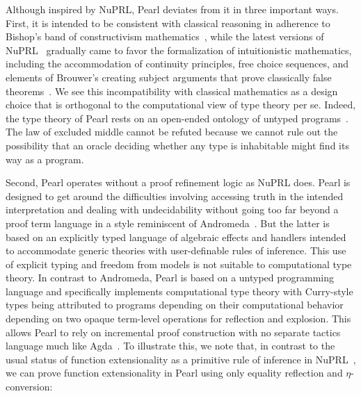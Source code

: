 \documentclass[a4paper]{article}
\begin{document}

Although inspired by NuPRL, Pearl deviates from it in three important ways. First, it is intended to be consistent with classical reasoning in adherence to Bishop's band of constructivism mathematics~\cite{bishop1967foundations}, while the latest versions of NuPRL~\cite{rahli2017bar, bickford2018computability, constable2020continuum} gradually came to favor the formalization of intuitionistic mathematics, including the accommodation of continuity principles, free choice sequences, and elements of Brouwer's creating subject arguments that prove classically false theorems~\cite{bentzen2025iep}. We see this incompatibility with classical mathematics as a design choice that is orthogonal to the computational view of type theory per se. Indeed, the type theory of Pearl rests on an open-ended ontology of untyped programs~\cite[\S11]{bentzen2026book}. The law of excluded middle cannot be refuted because we cannot rule out the possibility that an oracle deciding whether any type is inhabitable might find its way as a program. 

Second, Pearl operates without a proof refinement logic as NuPRL does. Pearl is designed to get around the difficulties involving accessing truth in the intended interpretation and dealing with undecidability without going too far beyond a proof term language in a style reminiscent of Andromeda~\cite{bauer2018design}. But the latter is based on an explicitly typed language of algebraic effects and handlers intended to accommodate generic theories with user-definable rules of inference. This use of explicit typing and freedom from models is not suitable to computational type theory. In contrast to Andromeda, Pearl is based on a untyped programming language and specifically implements computational type theory with Curry-style types being attributed to programs depending on their computational behavior depending on two opaque term-level operations for reflection and explosion. This allows Pearl to rely on incremental proof construction with no separate tactics language much like Agda~\cite{norell2009agda}. 
To illustrate this, we note that, in contrast to the usual status of function extensionality as a primitive rule of inference in NuPRL~\cites[p.~179]{nuprl}[A.3.1]{kreitz2002nuprl}, we can prove function extensionality in Pearl using only equality reflection and $\eta$-conversion:

\end{document}
